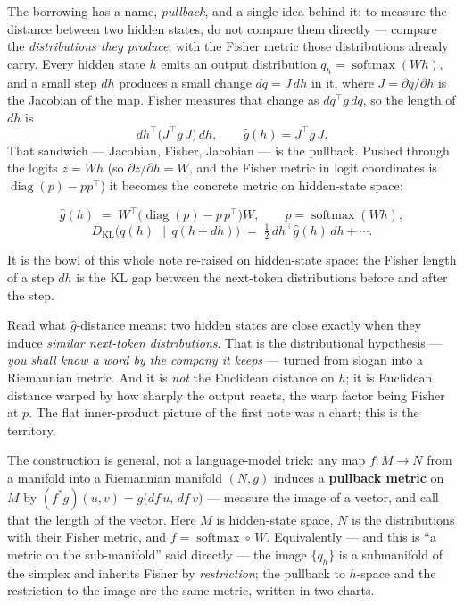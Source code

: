 \documentclass[11pt]{article}
\begin{document}
The borrowing has a name, \emph{pullback}, and a single idea behind it: to measure the distance
between two hidden states, do not compare them directly --- compare the \emph{distributions they
produce}, with the Fisher metric those distributions already carry. Every hidden state $h$ emits
an output distribution $q_h = \operatorname{softmax}(Wh)$, and a small step $dh$ produces a small
change $dq = J\,dh$ in it, where $J = \partial q/\partial h$ is the Jacobian of the map. Fisher
measures that change as $dq^\top g\, dq$, so the length of $dh$ is
\[
  dh^\top \big(J^\top g\, J\big)\, dh, \qquad \hat g(h) = J^\top g\, J.
\]
That sandwich --- Jacobian, Fisher, Jacobian --- is the pullback. Pushed through the logits
$z = Wh$ (so $\partial z/\partial h = W$, and the Fisher metric in logit coordinates is
$\operatorname{diag}(p) - p p^\top$) it becomes the concrete metric on hidden-state space:
\begin{summary}
\[
  \hat g(h) \;=\; W^\top\big(\operatorname{diag}(p) - p\,p^\top\big)W, \qquad p = \operatorname{softmax}(Wh),
\]
\[
  D_{\mathrm{KL}}\big(q(h) \,\|\, q(h+dh)\big) \;=\; \tfrac12\, dh^\top \hat g(h)\, dh + \cdots.
\]
\end{summary}
It is the bowl of this whole note re-raised on hidden-state space: the Fisher length of a step
$dh$ is the KL gap between the next-token distributions before and after the step.

\begin{insight}
Read what $\hat g$-distance means: two hidden states are close exactly when they induce
\emph{similar next-token distributions}. That is the distributional hypothesis --- \emph{you shall
know a word by the company it keeps} --- turned from slogan into a Riemannian metric. And it is
\emph{not} the Euclidean distance on $h$; it is Euclidean distance warped by how sharply the
output reacts, the warp factor being Fisher at $p$. The flat inner-product picture of the first
note was a chart; this is the territory.
\end{insight}

The construction is general, not a language-model trick: any map $f \colon M \to N$ from a
manifold into a Riemannian manifold $(N, g)$ induces a \textbf{pullback metric} on $M$ by
$(f^{*}g)(u,v) = g\big(df\,u,\, df\,v\big)$ --- measure the image of a vector, and call that the
length of the vector. Here $M$ is hidden-state space, $N$ is the distributions with their Fisher
metric, and $f = \operatorname{softmax}\circ\,W$. Equivalently --- and this is ``a metric on the
sub-manifold'' said directly --- the image $\{q_h\}$ is a submanifold of the simplex and inherits
Fisher by \emph{restriction}; the pullback to $h$-space and the restriction to the image are the
same metric, written in two charts.
\end{document}
